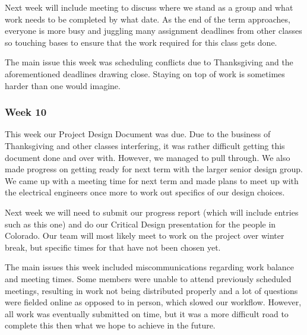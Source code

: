 Next week will include meeting to discuss where we stand as a group and what work needs to be completed by what date.
As the end of the term approaches, everyone is more busy and juggling many assignment deadlines from other classes
so touching bases to ensure that the work required for this class gets done.

The main issue this week was scheduling conflicts due to Thanksgiving and the aforementioned deadlines drawing
close. Staying on top of work is sometimes harder than one would imagine.

\subsubsection{Week 10}
This week our Project Design Document was due. Due to the business of Thanksgiving and other classes interfering, 
it was rather difficult getting this document done and over with. However, we managed to pull through. We also
made progress on getting ready for next term with the larger senior design group. We came up with a meeting time
for next term and made plans to meet up with the electrical engineers once more to work out specifics
of our design choices.

Next week we will need to submit our progress report (which will include entries such as this one) and do
our Critical Design presentation for the people in Colorado. Our team will most likely meet to work on the
project over winter break, but specific times for that have not been chosen yet.

The main issues this week included miscommunications regarding work balance and meeting times. Some
members were unable to attend previously scheduled meetings, resulting in work not being distributed
properly and a lot of questions were fielded online as opposed to in person, which slowed our workflow.
However, all work was eventually submitted on time, but it was a more difficult road to complete this then
what we hope to achieve in the future.
